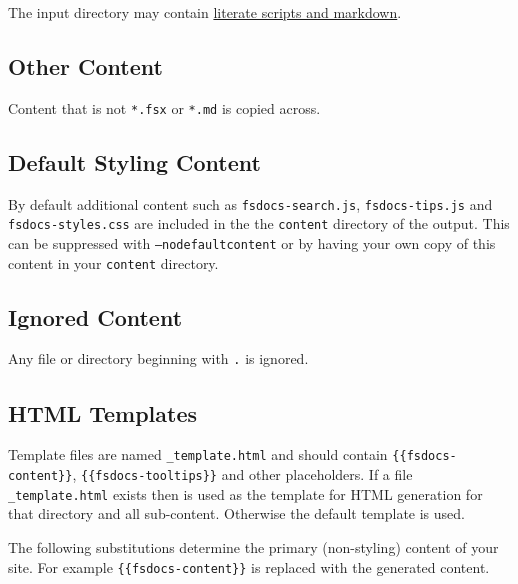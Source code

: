 \documentclass{article}
\begin{document}
The input directory may contain \href{literate.html}{literate scripts and markdown}.
\subsection*{Other Content}



Content that is not \texttt{*.fsx} or \texttt{*.md} is copied across.
\subsection*{Default Styling Content}



By default additional content such as \texttt{fsdocs-search.js}, \texttt{fsdocs-tips.js} and \texttt{fsdocs-styles.css} are included in the
the \texttt{content} directory of the output.  This can be suppressed with \texttt{--nodefaultcontent} or by having your own
copy of this content in your \texttt{content} directory.
\subsection*{Ignored Content}



Any file or directory beginning with \texttt{.} is ignored.
\subsection*{HTML Templates}



Template files are named \texttt{\_template.html} and should contain \texttt{\{\{fsdocs-content\}\}},  \texttt{\{\{fsdocs-tooltips\}\}}
and other placeholders.
If a file \texttt{\_template.html} exists then is used as the template for HTML generation for that directory and all sub-content.
Otherwise the default template is used.


The following substitutions determine the primary (non-styling) content of your site.
For example \texttt{\{\{fsdocs-content\}\}} is replaced with the generated content.
\end{document}
